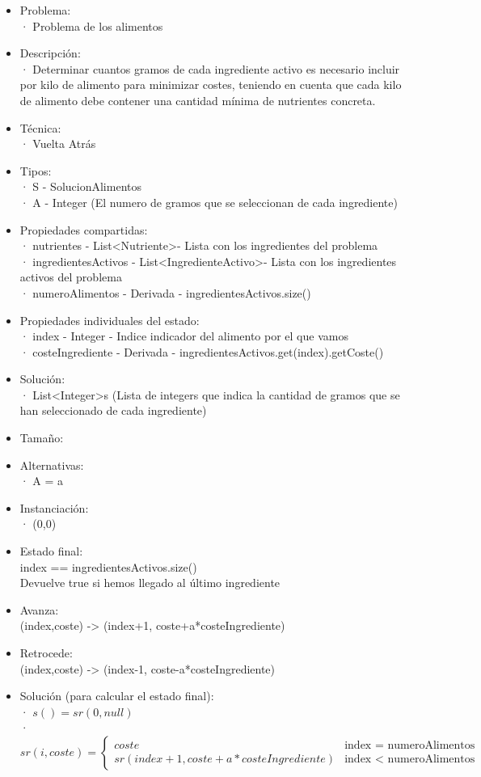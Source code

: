 \documentclass[a4paper,12pt]{article}
\begin{document}
\begin{itemize}

\item Problema: \\
      · Problema de los alimentos
\item Descripción: \\
· Determinar cuantos gramos de cada ingrediente activo es necesario incluir por kilo
de alimento para minimizar costes, teniendo en cuenta que cada kilo de alimento debe
contener una cantidad mínima de nutrientes concreta.
\item Técnica:\\
      · Vuelta Atrás
\item Tipos:\\
      · S - SolucionAlimentos\\
      · A - Integer \in [0,1000] (El numero de gramos que se seleccionan de cada ingrediente)
\item Propiedades compartidas:\\
      · nutrientes - List\textless Nutriente\textgreater - Lista con los ingredientes del problema\\
      · ingredientesActivos - List\textless IngredienteActivo\textgreater - Lista con los ingredientes activos del problema\\
      · numeroAlimentos - Derivada - ingredientesActivos.size()
\item Propiedades individuales del estado:\\
      · index - Integer - Indice indicador del alimento por el que vamos\\
      · costeIngrediente - Derivada - ingredientesActivos.get(index).getCoste()
\item Solución:\\
      · List\textless Integer\textgreater s (Lista de integers que indica la cantidad de gramos que se han seleccionado de cada ingrediente)
\item Tamaño:
\item Alternativas:\\
      · A = {a \in [0,1000]}
\item Instanciación:\\
      · (0,0)
\item Estado final:\\
      index == ingredientesActivos.size() \\Devuelve true si hemos llegado al último ingrediente
\item Avanza:\\
      (index,coste) -> (index+1, coste+a*costeIngrediente)
\item Retrocede:\\
      (index,coste) -> (index-1, coste-a*costeIngrediente)
\item Solución (para calcular el estado final):\\
      · $s() = sr(0,null)$\\
      · $sr(i, coste) =
      \begin{cases}
      coste  &\mbox{index = numeroAlimentos}\\
      sr(index+1, coste+a*costeIngrediente) &\mbox{index < numeroAlimentos}
      \end{cases}$


\end{itemize}
\end{document}
